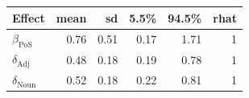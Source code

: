 
\begin{tabular}[t]{lrrrrr}
\toprule
Effect & mean & sd & 5.5\% & 94.5\% & rhat\\
\midrule
$\beta_{\text{PoS}}$ & 0.76 & 0.51 & 0.17 & 1.71 & 1\\
$\delta_{\text{Adj}}$ & 0.48 & 0.18 & 0.19 & 0.78 & 1\\
$\delta_{\text{Noun}}$ & 0.52 & 0.18 & 0.22 & 0.81 & 1\\
\bottomrule
\end{tabular}
